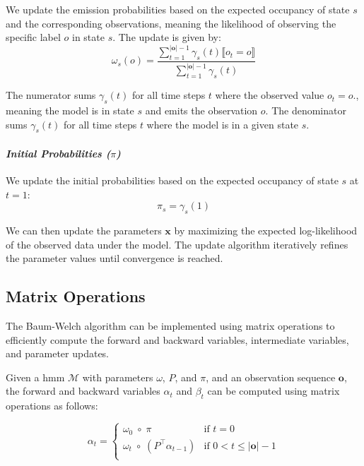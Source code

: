 We update the emission probabilities based on the expected occupancy of state $s$ and the corresponding observations, meaning the likelihood of observing the specific label $o$ in state $s$. 
The update is given by:
\begin{equation}
    \omega_s(o) = \frac{\sum_{t = 1}^{|\mathbf{o}|-1} \gamma_s(t) \lBrack o_t = o \rBrack}{\sum_{t = 1}^{|\mathbf{o}|-1} \gamma_s(t)}
    \label{eq:omega}
\end{equation}

The numerator sums $\gamma_s(t)$ for all time steps $t$ where the observed value $o_t = o$., meaning the model is in state $s$ and emits the observation $o$.
The denominator sums $\gamma_s(t)$ for all time steps $t$ where the model is in a given state $s$.


\paragraph*{\textit{Initial Probabilities ($\pi$)}}

We update the initial probabilities based on the expected occupancy of state $s$ at $t = 1$:
\begin{equation}
    \pi_s = \gamma_s(1)
    \label{eq:initial-probabilities}
\end{equation}

We can then update the parameters $\mathbf{x}$ by maximizing the expected log-likelihood of the observed data under the model.
The update algorithm iteratively refines the parameter values until convergence is reached.

\subsection{Matrix Operations}\label{subsec:matrix-operations}
The Baum-Welch algorithm can be implemented using matrix operations to efficiently compute the forward and backward variables, intermediate variables, and parameter updates.

Given a \gls{hmm} $\mathcal{M}$ with parameters $\omega$, $P$, and $\pi$, and an observation sequence $\mathbf{o}$, the forward and backward variables $\alpha_t$ and $\beta_t$ can be computed using matrix operations as follows:

\begin{equation}
    \label{eq:alpha}
    \alpha_t =
    \begin{cases}
        \omega_0 \; \circ \; \pi   & \text{if } t = 0    \\
        \omega_t \; \circ \; \left( {P}^\top \alpha_{t - 1} \right)   & \text{if } 0 < t \leq |\mathbf{o}|-1 \\
    \end{cases}
\end{equation}


